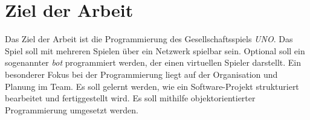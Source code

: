 
\chapter{Ziel der Arbeit }

Das Ziel der Arbeit ist die Programmierung des Gesellschaftsspiels \textit{UNO}. Das Spiel soll mit mehreren Spielen über ein Netzwerk spielbar sein. Optional soll ein sogenannter \textit{bot} programmiert werden, der einen virtuellen Spieler darstellt. Ein besonderer Fokus bei der Programmierung liegt auf der Organisation und Planung im Team. Es soll gelernt werden, wie ein Software-Projekt strukturiert bearbeitet und fertiggestellt wird. Es soll mithilfe objektorientierter Programmierung umgesetzt werden.